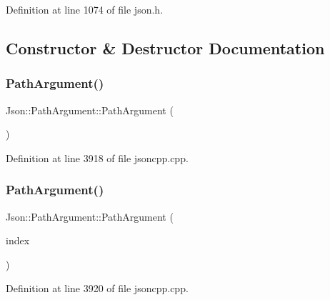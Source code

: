 Definition at line 1074 of file json.\+h.



\subsection{Constructor \& Destructor Documentation}
\hypertarget{class_json_1_1_path_argument_a3c96ed20c56a55eb76d37a11553c528e}{}\label{class_json_1_1_path_argument_a3c96ed20c56a55eb76d37a11553c528e} 
\subsubsection{\texorpdfstring{Path\+Argument()}{PathArgument()}\hspace{0.1cm}{\footnotesize\ttfamily [1/8]}}
{\footnotesize\ttfamily Json\+::\+Path\+Argument\+::\+Path\+Argument (\begin{DoxyParamCaption}{ }\end{DoxyParamCaption})}



Definition at line 3918 of file jsoncpp.\+cpp.

\hypertarget{class_json_1_1_path_argument_a53c5b27143b161301b95fd544c139ecf}{}\label{class_json_1_1_path_argument_a53c5b27143b161301b95fd544c139ecf} 
\subsubsection{\texorpdfstring{Path\+Argument()}{PathArgument()}\hspace{0.1cm}{\footnotesize\ttfamily [2/8]}}
{\footnotesize\ttfamily Json\+::\+Path\+Argument\+::\+Path\+Argument (\begin{DoxyParamCaption}\item[{\hyperlink{namespace_json_a8048e741f2177c3b5d9ede4a5b8c53c2}{Array\+Index}}]{index }\end{DoxyParamCaption})}



Definition at line 3920 of file jsoncpp.\+cpp.

\hypertarget{class_json_1_1_path_argument_a9690417a8a40e6e49f2acdf6c9281345}{}\label{class_json_1_1_path_argument_a9690417a8a40e6e49f2acdf6c9281345} 
